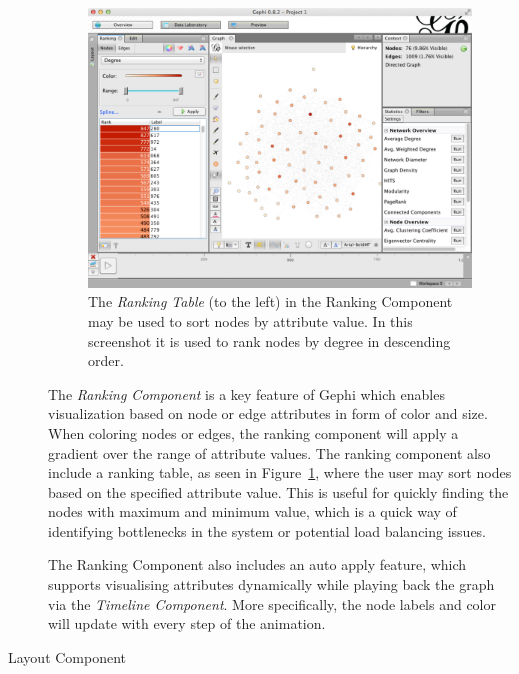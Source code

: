 \begin{description}
    \begin{figure}[h!]
        \centering
        \includegraphics[width=\linewidth]{figures/gui_ranking_table}
        \caption{The \emph{Ranking Table} (to the left) in the Ranking Component may
            be used to sort nodes by attribute value. In this
            screenshot it is used to rank nodes by degree in descending
            order.}
        \label{fig:ranking_table}
    \end{figure}

    The \emph{Ranking Component} is a key feature of Gephi which enables
    visualization based on node or edge attributes in form of color and
    size. When coloring nodes or edges, the ranking component will apply
    a gradient over the range of attribute values. The ranking component
    also include a ranking table, as seen in
    Figure~\ref{fig:ranking_table}, where the user may sort nodes based
    on the specified attribute value. This is useful for quickly finding
    the nodes with maximum and minimum value, which is a quick way of
    identifying bottlenecks in the system or potential load balancing
    issues.

    The Ranking Component also includes an auto apply feature, which
    supports visualising attributes dynamically while playing back the
    graph via the \emph{Timeline Component}. More specifically, the node labels and color
    will update with every step of the animation.

\item[Layout Component] \hfill \\


\end{description}
